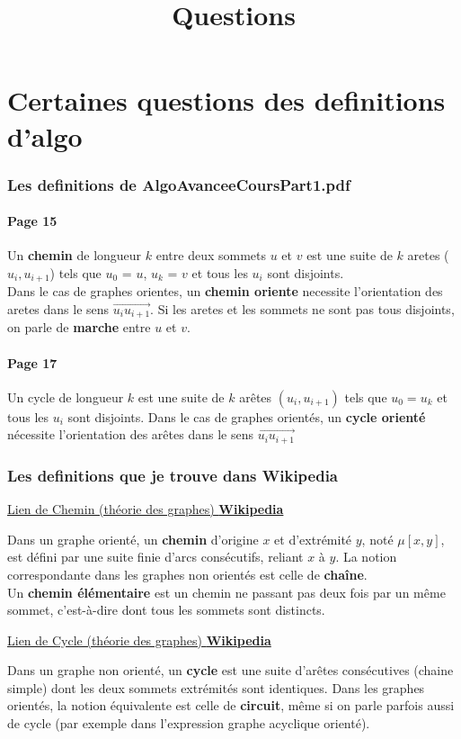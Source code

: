 \documentclass{fphw}
\begin{document}
\title{Questions}
\part*{Certaines questions des definitions d'algo}
\section{Les definitions de AlgoAvanceeCoursPart1.pdf}
\subsection*{Page 15}
Un \textbf{chemin} de longueur $k$ entre deux sommets $u$ et $v$ est une suite de $k$ aretes ($u_i, u_{i+1} $) tels que $u_0$ = $u$, $u_k$ = $v$ et tous les $u_i$ sont disjoints.\\
Dans le cas de graphes orientes, un \textbf{chemin oriente} necessite l’orientation des
aretes dans le sens  $\overrightarrow{u_i u_{i+1}}$.
Si les aretes et les sommets ne sont pas tous disjoints, on parle de \textbf{marche} entre
$u$ et $v$.

\subsection*{Page 17}
Un cycle de longueur $k$ est une suite de $k$ arêtes $\left(u_{i}, u_{i+1}\right)$ tels que $u_{0}=u_{k}$ et tous les $u_{i}$ sont disjoints.
Dans le cas de graphes orientés, un \textbf{cycle orienté} nécessite l'orientation des arêtes dans le sens $\overrightarrow{u_{i} u_{i+1}}$
	
	
\section{Les definitions que je trouve dans Wikipedia}
\begin{center}
\href{https://fr.wikipedia.org/wiki/Chemin_(th%C3%A9orie_des_graphes)}{Lien de Chemin (théorie des graphes) \textbf{Wikipedia}}\\


\end{center}

Dans un graphe orienté, un \textbf{chemin} d'origine $x$ et d'extrémité $y$, noté $\mu[x, y]$, est défini par une suite finie d'arcs consécutifs, reliant $x$ à $y .$ La notion correspondante dans les graphes non orientés est celle de \textbf{ chaîne}.\\
Un \textbf{ chemin élémentaire} est un chemin ne passant pas deux fois par un même sommet, c'est-à-dire dont tous les sommets sont distincts.
\\
\begin{center}
\href{https://fr.wikipedia.org/wiki/Cycle_(th%C3%A9orie_des_graphes))}{Lien de Cycle (théorie des graphes) \textbf{Wikipedia}}
\end{center}
Dans un graphe non orienté, un \textbf{cycle} est une suite d'arêtes consécutives (chaine simple) dont les deux sommets extrémités sont identiques. Dans les graphes orientés, la notion équivalente est celle de \textbf{circuit}, même si on parle parfois aussi de cycle (par exemple dans l'expression graphe acyclique orienté).
\end{document}
